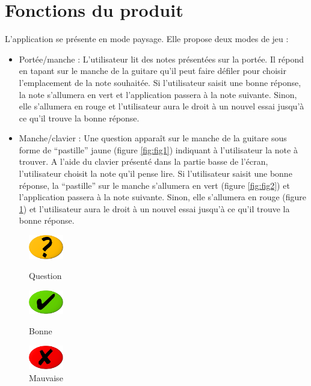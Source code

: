 \documentclass{scrreprt}
\begin{document}
\section{Fonctions du produit}


L’application se présente en mode paysage. Elle propose deux modes de jeu :
\begin{itemize}
\item Portée/manche : L’utilisateur lit des notes présentées sur la portée. Il répond en tapant sur le manche de la guitare qu’il peut faire défiler pour choisir l’emplacement de la note souhaitée. Si l’utilisateur saisit une bonne réponse, la note s’allumera en vert et l’application passera à la note suivante. Sinon, elle s’allumera en rouge et l’utilisateur aura le droit à un nouvel essai jusqu’à ce qu’il trouve la bonne réponse.

\medbreak

\item Manche/clavier : Une question apparaît sur le manche de la guitare sous forme de “pastille” jaune (figure \ref{fig:fig1}) indiquant à l’utilisateur la note à trouver.
A l’aide du clavier présenté dans la partie basse de l’écran, l’utilisateur choisit la note qu’il pense lire.  
Si l’utilisateur saisit une bonne réponse, la “pastille” sur le manche s’allumera en vert (figure \ref{fig:fig2}) et l’application passera à la note suivante. 
Sinon, elle s’allumera en rouge (figure \ref{fig:fig3}) et l’utilisateur aura le droit à un nouvel essai jusqu’à ce qu’il trouve la bonne réponse.
\end{itemize}

\begin{figure}[!ht]
   \centering
   \begin{minipage}[t]{4cm}
      \centering
      \includegraphics[width=1.5cm]{images/fingering_question.png}
      \caption{Question}
	\label{fig:fig1}
   \end{minipage}
   \begin{minipage}[t]{4cm}
      \centering
      \includegraphics[width=1.5cm]{images/fingering_good.png}
      \caption{Bonne}
	\label{fig:fig2}
   \end{minipage}
   \begin{minipage}[t]{4cm}
      \centering
      \includegraphics[width=1.5cm]{images/fingering_bad.png}
      \caption{Mauvaise}
	\label{fig:fig3}
   \end{minipage}
\end{figure}
\end{document}
